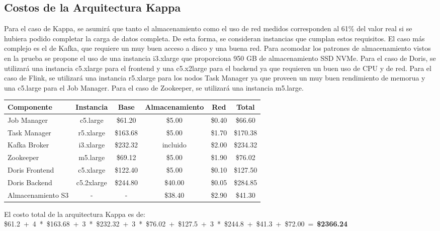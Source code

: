 \newpage
\subsection{Costos de la Arquitectura Kappa}

Para el caso de Kappa, se asumirá que tanto el almacenamiento como el uso de red medidos corresponden al 61\% del valor real si se hubiera podido completar la carga de datos completa.
De esta forma, se consideran instancias que cumplan estos requisitos. 
El caso más complejo es el de Kafka, que requiere un muy buen acceso a disco y una buena red. 
Para acomodar los patrones de almacenamiento vistos en la prueba se propone el uso de una instancia i3.xlarge que proporciona 950 GB de almacenamiento SSD NVMe.
Para el caso de Doris, se utilizará una instancia c5.xlarge para el frontend y una c5.x2large para el backend ya que requieren un buen uso de CPU y de red.
Para el caso de Flink, se utilizará una instancia r5.xlarge para los nodos Task Manager  ya que proveen un muy buen rendimiento de memorua y una c5.large para el Job Manager.
Para el caso de Zookeeper, se utilizará una instancia m5.large.  


\begin{longtable}{|p{3cm}|c|c|c|c|c|}
    \hline
    \textbf{Componente} & \textbf{Instancia} & \textbf{Base} & \textbf{Almacenamiento} & \textbf{Red} & \textbf{Total} \\
    \hline
    Job Manager & c5.large & \$61.20 & \$5.00 & \$0.40 & \$66.60 \\
    \hline
    Task Manager & r5.xlarge & \$163.68 & \$5.00 & \$1.70 & \$170.38 \\
    \hline
    Kafka Broker & i3.xlarge & \$232.32 & incluido & \$2.00 & \$234.32 \\
    \hline
    Zookeeper & m5.large & \$69.12 & \$5.00 & \$1.90 & \$76.02 \\
    \hline
    Doris Frontend & c5.xlarge & \$122.40 & \$5.00 & \$0.10 & \$127.50 \\
    \hline
    Doris Backend & c5.2xlarge & \$244.80 & \$40.00 & \$0.05 & \$284.85 \\
    \hline
    Almacenamiento S3 & - & - & \$38.40 & \$2.90 & \$41.30 \\
    \hline
\end{longtable}

El costo total de la arquitectura Kappa es de: 
\newline
\newline
\hbox{{\footnotesize\$61.2 + 4 * \$163.68 + 3 * \$232.32 + 3 * \$76.02 + \$127.5 + 3 * \$244.8 + \$41.3 + \$72.00 = \textbf{\$2366.24}}}

